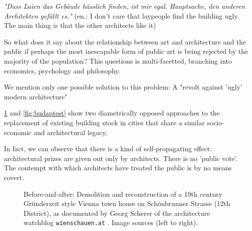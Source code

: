 \documentclass{article}
\begin{document}
\begin{multicols}{2}
\textit{"Dass Laien das Gebäude hässlich finden, ist mir egal. Hauptsache, den anderen Architekten gefällt es."} (en.: I don't care that laypeople find the building ugly. The main thing is that the other architects like it) 

So what does it say about the relationship between art and architecture and the public if perhaps the most inescapable form of public art is being rejected by the majority of the population? This questions is multi-facetted, branching into economics, psychology and philosophy.

We mention only one possible solution to this problem: A "revolt against 'ugly' modern architecture" \cite{gersten_scandinavian_2023}

\cref{fig:vienna} and \cref{fig:budaptest} show two diametrically opposed approaches to the replacement of existing building stock in cities that share a similar socio-economic and architectural legacy. 

In fact, we can observe that there is a kind of self-propagating effect: architectural prizes are given out only by architects. There is no 'public vote'. The contempt with which architects have treated the public is by no means covert. 


\end{multicols}

\begin{figure}[ht!]
    \centering
    \caption{Before-and-after: Demolition and reconstruction of a 19th century Gründerzeit style Vienna town house on Schönbrunner Strasse (12th District), as documented by Georg Scherer of the architecture watchblog \texttt{wienschauen.at} \cite{scherer_zerstorung_nodate}. Image sources (left to right): \cite{scherer_schonbrunner_2018}\cite{wikimedia_commons_user_guentherz_wohnhaus_2014}}
    \label{fig:vienna}
\end{figure}
\end{document}

